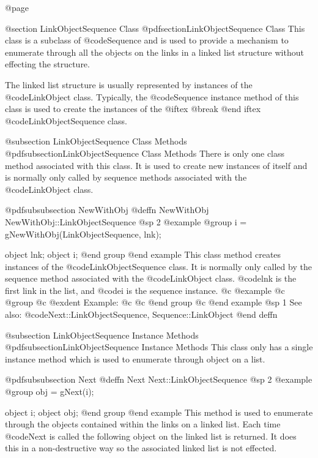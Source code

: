 @page

@section LinkObjectSequence Class
@pdfsection{LinkObjectSequence Class}
This class is a subclass of @code{Sequence} and is used to provide a
mechanism to enumerate through all the objects on the links in a linked
list structure without effecting the structure.

The linked list structure is usually represented by instances of the
@code{LinkObject} class.  Typically, the @code{Sequence} instance method
of this class is used to create the instances of the
@iftex @break @end iftex
@code{LinkObjectSequence} class.



@subsection LinkObjectSequence Class Methods
@pdfsubsection{LinkObjectSequence Class Methods}
There is only one class method associated with this class.  It is used
to create new instances of itself and is normally only called by
sequence methods associated with the @code{LinkObject} class.





@pdfsubsubsection {NewWithObj}
@deffn {NewWithObj} NewWithObj::LinkObjectSequence
@sp 2
@example
@group
i = gNewWithObj(LinkObjectSequence, lnk);

object  lnk;
object  i;
@end group
@end example
This class method creates instances of the @code{LinkObjectSequence}
class.  It is normally only called by the sequence method associated
with the @code{LinkObject} class.  @code{lnk} is the first link in the
list, and @code{i} is the sequence instance.
@c @example
@c @group
@c @exdent Example:
@c 
@c @end group
@c @end example
@sp 1
See also:  @code{Next::LinkObjectSequence, Sequence::LinkObject}
@end deffn




@subsection LinkObjectSequence Instance Methods
@pdfsubsection{LinkObjectSequence Instance Methods}
This class only has a single instance method which is used to enumerate
through object on a list.






@pdfsubsubsection {Next}
@deffn {Next} Next::LinkObjectSequence
@sp 2
@example
@group
obj = gNext(i);

object  i;
object  obj;
@end group
@end example
This method is used to enumerate through the objects contained within
the links on a linked list.  Each time @code{Next} is called the
following object on the linked list is returned.  It does this in a
non-destructive way so the associated linked list is not effected.


